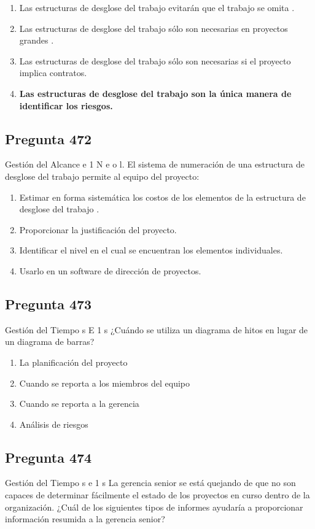 \documentclass[11pt,a4paper]{article}
\begin{document}
\begin{enumerate}[label=\alph*)]
  \item Las estructuras de desglose del trabajo evitarán que el trabajo se omita .
  \item Las estructuras de desglose del trabajo sólo son necesarias en proyectos grandes .
  \item Las estructuras de desglose del trabajo sólo son necesarias si el proyecto implica contratos.
  \item \textbf{Las estructuras de desglose del trabajo son la única manera de identificar los riesgos.}
\end{enumerate}

\subsection*{Pregunta 472}
Gestión del Alcance e 1 N e o l. El sistema de numeración de una estructura de desglose del trabajo permite al equipo del proyecto:

\begin{enumerate}[label=\alph*)]
  \item Estimar en forma sistemática los costos de los elementos de la estructura de desglose del trabajo .
  \item Proporcionar la justificación del proyecto.
  \item Identificar el nivel en el cual se encuentran los elementos individuales.
  \item Usarlo en un software de dirección de proyectos.
\end{enumerate}

\subsection*{Pregunta 473}
Gestión del Tiempo s E 1 s ¿Cuándo se utiliza un diagrama de hitos en lugar de un diagrama de barras?

\begin{enumerate}[label=\alph*)]
  \item La planificación del proyecto
  \item Cuando se reporta a los miembros del equipo
  \item Cuando se reporta a la gerencia
  \item Análisis de riesgos
\end{enumerate}

\subsection*{Pregunta 474}
Gestión del Tiempo s e 1 s La gerencia senior se está quejando de que no son capaces de determinar fácilmente el estado de los proyectos en curso dentro de la organización. ¿Cuál de los siguientes tipos de informes ayudaría a proporcionar información resumida a la gerencia senior?
\end{document}
